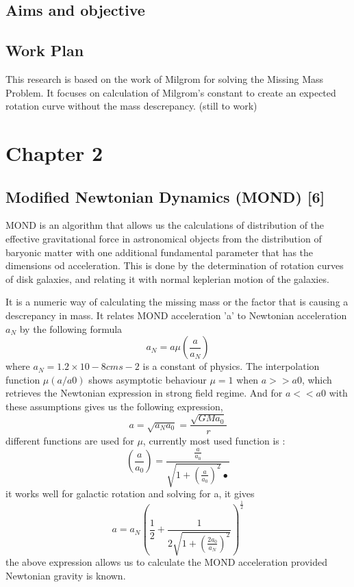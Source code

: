\documentclass{article}
\begin{document}
\subsection{Aims and objective} 

\subsection{Work Plan}
 This research is based on the work of Milgrom for solving the Missing Mass Problem. It focuses on calculation of Milgrom's constant to create an expected rotation curve without the mass descrepancy. 
(still to work)

\section{Chapter 2}
\subsection{Modified Newtonian Dynamics (MOND) [6]}
MOND is an algorithm that allows us the calculations of distribution of the effective gravitational force in astronomical objects from the distribution of baryonic matter with one additional fundamental parameter that has the dimensions od acceleration. This  is done by the determination of rotation curves of disk galaxies, and relating it with normal keplerian motion of the galaxies. 

 It is a numeric way of calculating the missing mass or the factor that is causing a descrepancy in mass. It relates MOND acceleration 'a' to Newtonian acceleration $a_{N}$ by the following formula \begin{equation}
 a_{N}= a\mu(\frac{a}{a_{N}})
\end{equation}
where $a_{N} = 1.2×10-8  cms-2$  is a constant of physics. 
The interpolation function $\mu (a/a0)$ shows asymptotic behaviour $\mu=1$ when $a>> a0$,  which retrieves the Newtonian expression in strong field regime. And for $a << a0$ with these assumptions gives us the following expression, 
\begin{equation}
a= \sqrt{a_{N}a_{0}}= \frac{\sqrt{GMa_{0}}}{r}
\end{equation} 
different functions are used for $\mu$, currently most used function is :
\begin{equation}
(\frac{a}{a_{0}}) = \frac{\frac{a}{a_{0}}}{\sqrt{1+(\frac{a}{a_{0}})^2}•}
\end{equation} 
it works well for galactic rotation and solving for a, it gives 
\begin{equation}
a= a_{N}(\frac{1}{2}+\frac{1}{2\sqrt{1+(\frac{2a_{0}}{a_{N}})^2}})^\frac{1}{2}
\end{equation}
the above expression allows us to calculate the MOND acceleration provided Newtonian gravity is known.
\end{document}
